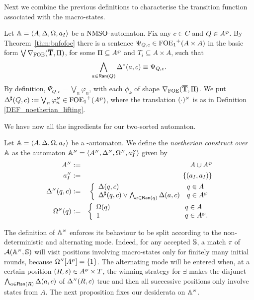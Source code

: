  Next we combine the previous definitions to characterise the transition function associated with the macro-states.
\begin{definition}\label{PROP_DeltaPowerset}
Let $\mathbb{A} = \langle{A,\Delta,\Omega,a_I}\rangle$ be a $\mathrm{NMSO}$-automaton. Fix any $c \in C$ and $Q \in A^{\wp}$. By Theorem~\ref{thm:bnfofoe} there is a sentence $\Psi_{Q,c} \in {\ensuremath{\mathrm{FOE}_1}}^+(A\times A)$ in the basic form $\bigvee \nabla_{\mathrm{FOE}}(\overline{{\mathbf{T}}},\Pi)$, for some $\Pi \subseteq A^{\wp}$ and $T_i \subseteq A \times A$, such that
$$\bigwedge_{a \in \mathsf{Ran}(Q)} \Delta^{*}(a,c) \equiv \Psi_{Q,c}.$$
By definition, $\Psi_{Q,c} = \bigvee_{n}\varphi_n$, with each $\phi_{k}$ of shape $\nabla_{\mathrm{FOE}}(\overline{{\mathbf{T}}},\Pi)$.
%
We put $\Delta^{\sharp}(Q,c) := \bigvee_{n}\varphi_n^{{\scriptscriptstyle N}}  \in {\ensuremath{\mathrm{FOE}_1}}^+(A^{\wp})$, where the translation $(\cdot)^{{\scriptscriptstyle N}}$ is as in Definition \ref{DEF_noetherian_lifting}.
\end{definition}

\noindent We have now all the ingredients for our two-sorted automaton.

\begin{definition}\label{def:noetherianconstruct}
Let $\mathbb{A} = \langle{A,\Delta,\Omega,a_I}\rangle$ be a {\nmso-automaton}. We define the \emph{noetherian construct over $\mathbb{A}$} as the automaton $\mathbb{A}^{{\scriptscriptstyle N}} = \langle{A^{{\scriptscriptstyle N}},\Delta^{{\scriptscriptstyle N}},\Omega^{{\scriptscriptstyle N}},a_I^{{\scriptscriptstyle N}}}\rangle$ given by %
\begin{eqnarray*}
        A^{\noet} &:=& A \cup \shA \\
        a_I^{\noet} &:=& \{(a_I,a_I)\}\\
        \tmap^{\noet}(q,c) &:=& \left\{
	\begin{array}{ll}
        \tmap(q,c) & q\in A \\
		\shDe(q,c) \vee \bigwedge_{a \in \Ran(q)} \tmap(a,c) & q \in \shA
	\end{array}
\right.\\
        \pmap^{\noet}(q) &:=& \left\{
	\begin{array}{ll}
        \pmap(q) & \hspace{3.43cm} q\in A \\
		1 & \hspace{3.43cm} q \in \shA.
	\end{array}
\right.
\end{eqnarray*}%
\end{definition}
The definition of $\mathbb{A}^{{\scriptscriptstyle N}}$ enforces its behaviour to be split according to the non-deterministic and alternating mode. Indeed, for any accepted $\mathbb{S}$, a match $\pi$ of $\mathcal{A}(\mathbb{A}^{{\scriptscriptstyle N}},\mathbb{S})$ will visit positions involving macro-states only for finitely many initial rounds, because $\Omega^{{\scriptscriptstyle N}}[A^{\wp}] = \{1\}$. The alternating mode will be entered when, at a certain position $(R,s)\in A^{\wp} \times T$, the winning strategy for $\exists$ makes the disjunct $\bigwedge_{a \in \mathsf{Ran}(R)} \Delta(a,c)$ of $\Delta^{{\scriptscriptstyle N}}(R,c)$ true and then all successive positions only involve states from $A$. The next proposition fixes our desiderata on $\mathbb{A}^{{\scriptscriptstyle N}}$. 

